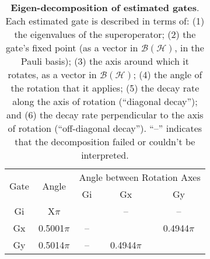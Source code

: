 {\begin{table}[h]
\begin{center}
\vspace{2em}
\begin{tabular}[l]{|c|c|c|c|c|}
\hline
\multirow{2}{*}{Gate} & \multirow{2}{*}{Angle} & \multicolumn{3}{c|}{Angle between Rotation Axes} \\ \cline{3-5}
 & & Gi & Gx & Gy \\ \hline
Gi & X$\pi$ &  & -- & -- \\ \hline
Gx & 0.5001$\pi$ & -- &  & 0.4944$\pi$ \\ \hline
Gy & 0.5014$\pi$ & -- & 0.4944$\pi$ &  \\ \hline
\end{tabular}

\caption{\textbf{Eigen-decomposition of estimated gates}.  Each estimated gate is described in terms of: (1) the eigenvalues of the superoperator; (2) the gate's fixed point (as a vector in $\mathcal{B}(\mathcal{H})$, in the Pauli basis); (3)  the axis around which it rotates, as a vector in $\mathcal{B}(\mathcal{H})$; (4) the angle of the rotation that it applies; (5) the decay rate along the axis of rotation (``diagonal decay''); and (6) the decay rate perpendicular to the axis of rotation (``off-diagonal decay'').  ``--'' indicates that the decomposition failed or couldn't be interpreted. \label{bestTPGatesetDecompTable}}
\end{center}
\end{table}


}
